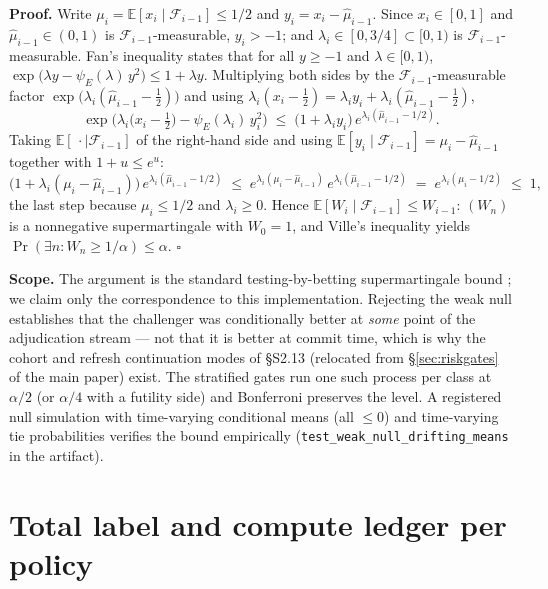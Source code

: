 \documentclass[a4paper,11pt]{article}
\begin{document}
\medskip
\noindent\textbf{Proof.} Write $\mu_i = \mathbb{E}[x_i \mid \mathcal F_{i-1}] \le 1/2$ and
$y_i = x_i - \hat\mu_{i-1}$. Since $x_i \in [0,1]$ and $\hat\mu_{i-1} \in (0,1)$ is
$\mathcal F_{i-1}$-measurable, $y_i > -1$; and $\lambda_i \in [0, 3/4] \subset [0,1)$ is
$\mathcal F_{i-1}$-measurable. Fan's inequality states that for all $y \ge -1$ and
$\lambda \in [0,1)$,
$\exp\big(\lambda y - \psi_E(\lambda)\, y^2\big) \le 1 + \lambda y$.
Multiplying both sides by the $\mathcal F_{i-1}$-measurable factor
$\exp\big(\lambda_i(\hat\mu_{i-1} - \tfrac12)\big)$ and using
$\lambda_i(x_i - \tfrac12) = \lambda_i y_i + \lambda_i(\hat\mu_{i-1} - \tfrac12)$,
$$\exp\Big(\lambda_i \big(x_i - \tfrac12\big) - \psi_E(\lambda_i)\, y_i^2\Big) \;\le\; \big(1 + \lambda_i y_i\big)\, e^{\lambda_i (\hat\mu_{i-1} - 1/2)} .$$
Taking $\mathbb{E}[\,\cdot \mid \mathcal F_{i-1}]$ of the right-hand side and using
$\mathbb{E}[y_i \mid \mathcal F_{i-1}] = \mu_i - \hat\mu_{i-1}$ together with $1 + u \le e^u$:
$$\big(1 + \lambda_i(\mu_i - \hat\mu_{i-1})\big)\, e^{\lambda_i(\hat\mu_{i-1} - 1/2)} \;\le\; e^{\lambda_i(\mu_i - \hat\mu_{i-1})}\, e^{\lambda_i(\hat\mu_{i-1} - 1/2)} \;=\; e^{\lambda_i(\mu_i - 1/2)} \;\le\; 1,$$
the last step because $\mu_i \le 1/2$ and $\lambda_i \ge 0$. Hence
$\mathbb{E}[W_i \mid \mathcal F_{i-1}] \le W_{i-1}$: $(W_n)$ is a nonnegative supermartingale with
$W_0 = 1$, and Ville's inequality yields $\Pr(\exists n: W_n \ge 1/\alpha) \le \alpha$. $\square$

\medskip
\noindent\textbf{Scope.} The argument is the standard testing-by-betting supermartingale bound
\cite{waudbysmith2023betting,howard2021timeuniform}; we claim only the correspondence to this
implementation. Rejecting the weak null establishes that the challenger was conditionally better
at \emph{some} point of the adjudication stream --- not that it is better at commit time, which is
why the cohort and refresh continuation modes of \S S2.13 (relocated from \S\ref{sec:riskgates} of the main paper) exist. The stratified
gates run one such process per class at $\alpha/2$ (or $\alpha/4$ with a futility side) and
Bonferroni preserves the level. A registered null simulation with time-varying conditional means
(all $\le 0$) and time-varying tie probabilities verifies the bound empirically
(\texttt{test\_weak\_null\_drifting\_means} in the artifact).

\section{Total label and compute ledger per policy}
\end{document}

